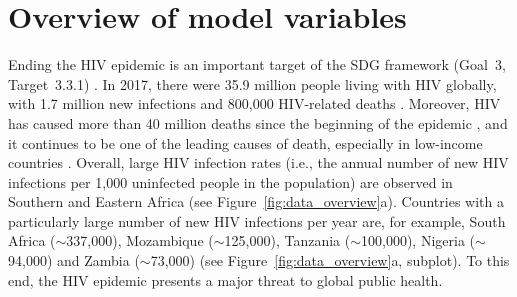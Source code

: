 \documentclass[sigconf]{acmart}
\begin{document}
\clearpage




\appendix

\renewcommand{\thetable}{S\arabic{table}}
\renewcommand{\thefigure}{S\arabic{figure}}
\setcounter{figure}{0}
\setcounter{table}{0}  





\section{Overview of model variables}
\label{supp:control_vars} %


Ending the HIV epidemic is an important target of the SDG framework (Goal~3, Target~3.3.1) \cite{UNindicators2017}. In 2017, there were 35.9 million people living with HIV globally, with 1.7 million new infections and 800,000 HIV-related deaths \cite{UNAIDShiv2022}. Moreover, HIV has caused more than 40 million deaths since the beginning of the epidemic \cite{UNAIDShiv2022}, and it continues to be one of the leading causes of death, especially in low-income countries \cite{WHOhiv2020}. Overall, large HIV infection rates (i.e., the annual number of new HIV infections per 1,000 uninfected people in the population) are observed in Southern and Eastern Africa (see Figure~\ref{fig:data_overview}a). Countries with a particularly large number of new HIV infections per year are, for example, South Africa ($\sim$337,000), Mozambique ($\sim$125,000), Tanzania ($\sim$100,000), Nigeria ($\sim$94,000) and Zambia ($\sim$73,000) (see Figure~\ref{fig:data_overview}a, subplot). To this end, the HIV epidemic presents a major threat to global public health. 
\end{document}
